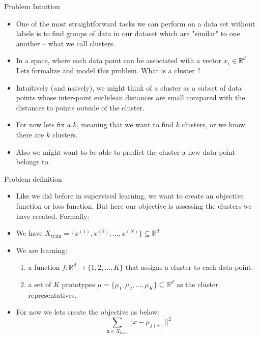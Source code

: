 \documentclass[serif, aspectratio=169]{beamer}
\begin{document}
\begin{frame}{Problem Intuition}
    \begin{itemize}
        \item One of the most straightforward tasks we can perform on a data set without labels is to find groups of data in our dataset which are "similar" to one another -- what we call clusters.
        \item  In a space, where each data point can be associated with a vector $x_i \in \mathbb{R}^d$. Lets formalize and model this problem. What is a cluster ?
        \item Intuitively (and naively), we might think of a cluster as a subset of data points whose inter-point euclidean distances are small compared with the distances to points outside of the cluster.
        \item For now lets fix a $k$, meaning that we want to find $k$ clusters, or we know there are $k$ clusters.
        \item Also we might want to be able to predict the cluster a new data-point belongs to.
        
    \end{itemize}
\end{frame}


\begin{frame}{Problem definition}
    \begin{itemize}
        \item Like we did before in supervised learning, we want to create an objective function or loss function. But here our objective is assessing the clusters we have created. Formally:
        \item We have $X_{\text{train}} = \{ x^{(1)}, x^{(2)}, \dots, x^{(N)} \} \subseteq \mathbb{R}^d$
        \item  We are learning:
        \begin{enumerate}
            \item a function $f:\mathbb{R}^d\to \{1,2, \dots , K\}$ that assigns a cluster to each data point. 
\item  a set of \( K \) prototypes \(\mu = \{ \mu_1, \mu_2, \dots, \mu_K  \} \subseteq \mathbb{R}^d \) as the cluster  representatives.
        \end{enumerate}
        \item For now we lets create the objective as below:
        $$
        \sum_{\mathbf{x} \in X_{\text{train}}} || x - \mu_{f(x)} ||^2
        $$
        
    \end{itemize}
\end{frame}
\end{document}
